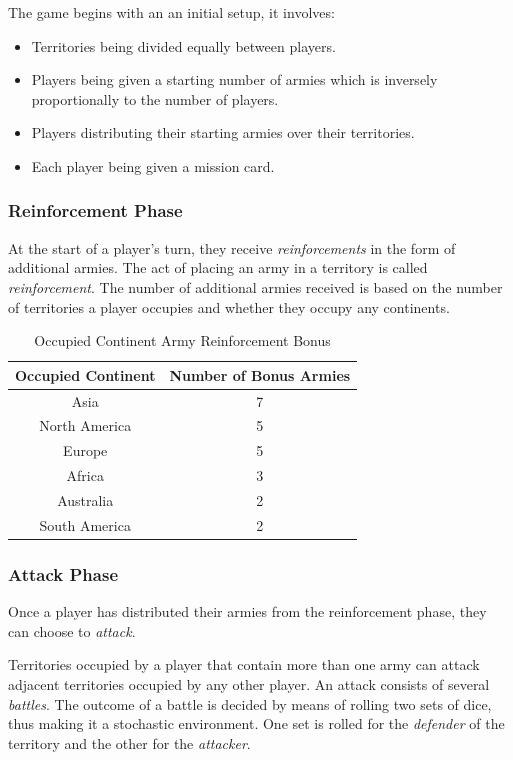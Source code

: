 \documentclass[parskip]{cs4rep}
\begin{document}
The game begins with an an initial setup, it involves:

\begin{itemize}
\item
Territories being divided equally between players.
\item
Players being given a starting number of armies which is inversely proportionally to the number of players.
\item
Players distributing their starting armies over their territories.
\item
Each player being given a mission card.
\end{itemize}

\subsubsection{Reinforcement Phase}

At the start of a player's turn, they receive \textit{reinforcements} in the form of additional armies. The act of placing an army in a territory is called \textit{reinforcement}.  The number of additional armies received is based on the number of territories a player occupies and whether they occupy any continents.
\newline

\begin{table}[ht]
\centering
\begin{tabular}{|c|c|}
\hline 
\textbf{Occupied Continent} & \textbf{Number of Bonus Armies} \\ 
\hline 
Asia & 7 \\ 
\hline 
North America & 5 \\ 
\hline 
Europe & 5 \\ 
\hline 
Africa & 3 \\
\hline
Australia & 2 \\
\hline  
South America & 2 \\
\hline 
\end{tabular}
\caption{Occupied Continent Army Reinforcement Bonus}
\label{table:continent-bonus}
\end{table}

\subsubsection{Attack Phase}

Once a player has distributed their armies from the reinforcement phase, they can choose to \textit{attack}. 

Territories occupied by a player that contain more than one army can attack adjacent territories occupied by any other player. An attack consists of several \textit{battles}. The outcome of a battle is decided by means of rolling two sets of dice, thus making it a stochastic environment. One set is rolled for the \textit{defender} of the territory and the other for the \textit{attacker}. 
\end{document}
